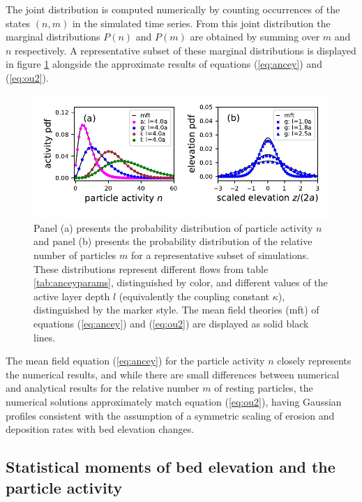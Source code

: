 The joint distribution is computed numerically by counting occurrences of the states $(n,m)$ in the simulated time series.
From this joint distribution the marginal distributions $P(n)$ and $P(m)$ are obtained by summing over $m$ and $n$ respectively.
A representative subset of these marginal distributions is displayed in figure \ref{fig:pdfs} alongside the approximate results of equations (\ref{eq:ancey}) and (\ref{eq:ou2}).
\begin{figure}[!htbp]
	\includegraphics[width=\linewidth,keepaspectratio]{./figures/ch3/distributions.pdf}
	\caption{Panel (a) presents the probability distribution of particle activity $n$ and panel (b) presents the probability distribution of the relative number of particles $m$ for a representative subset of simulations. These distributions represent different flows from table \ref{tab:anceyparams}, distinguished by color, and different values of the active layer depth $l$ (equivalently the coupling constant $\kappa$), distinguished by the marker style. The mean field theories (mft) of equations (\ref{eq:ancey}) and (\ref{eq:ou2}) are displayed as solid black lines.}
	\label{fig:pdfs}
\end{figure}
The mean field equation (\ref{eq:ancey}) for the particle activity $n$ closely represents the numerical results, and while there are small differences between numerical and analytical results for the relative number $m$ of resting particles, the numerical solutions approximately match equation (\ref{eq:ou2}), having Gaussian profiles consistent with the assumption of a symmetric scaling of erosion and deposition rates with bed elevation changes. 


\subsection{Statistical moments of bed elevation and the particle activity}
\label{sec:elemom}

